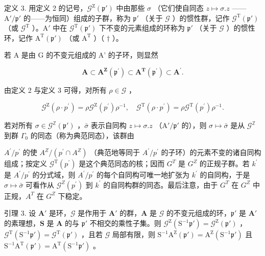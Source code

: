 定义 3. 用定义 2 的记号，\(\mathcal{G}^{\mathrm{Z}}(\mathfrak{p}')\) 中由那些 \(\sigma\) （它们使自同态 \(z \mapsto \sigma.z\) ——\(\mathrm{A}' / \mathfrak{p}'\) 的——为恒同）组成的子群，称为 \(\mathfrak{p}'\) （关于 \(\mathcal{G}\) ）的惯性群，记作 \(\mathcal{G}^{\mathrm{T}}(\mathfrak{p}')\) （或 \(\mathcal{G}^{\mathrm{T}}\) ）。\(\mathrm{A}'\) 中在 \(\mathcal{G}^{\mathrm{T}}(\mathfrak{p}')\) 下不变的元素组成的环称为 \(\mathfrak{p}'\) （关于 \(\mathcal{G}\) ）的惯性环，记作 \(\mathrm{A}^{\mathrm{T}}(\mathfrak{p}')\) （或 \(\mathrm{A}^{\mathrm{T}}\) ）（ \(\dagger\) ）。

若 A 是由 G 的不变元组成的 A' 的子环，则显然

\[
\mathbf {A} \subset \mathbf {A} ^ {\mathbf {Z}} (\mathfrak {p} ^ {\prime}) \subset \mathbf {A} ^ {\mathbf {T}} (\mathfrak {p} ^ {\prime}) \subset \mathbf {A} ^ {\prime}.\tag{1}
\]

由定义 2 与定义 3 可得，对所有 \(\rho \in \mathcal{G}\) ，

\[
\mathcal {G} ^ {\mathrm{Z}} (\rho \cdot p ^ {\prime}) = \rho \mathcal {G} ^ {\mathrm{Z}} (p ^ {\prime}) \rho^ {- 1}, \quad \mathcal {G} ^ {\mathrm{T}} (\rho \cdot p ^ {\prime}) = \rho \mathcal {G} ^ {\mathrm{T}} (p ^ {\prime}) \rho^ {- 1}.\tag{2}
\]

若对所有 \(\sigma \in \mathcal{G}^{\mathbb{Z}}(\mathfrak{p}')\) ，\(\bar{\sigma}\) 表示自同构 \(z \mapsto \sigma. z\) （\(\mathrm{A}' / \mathfrak{p}'\) 的），则 \(\sigma \mapsto \bar{\sigma}\) 是从 \(\mathcal{G}^{\mathbb{Z}}\) 到群 \(\Gamma_0\) 的同态（称为典范同态），该群由

\(A^{\prime}/p^{\prime}\) 的使 \(A^{Z}/(p^{\prime} \cap A^{Z})\) （典范地等同于 \(A^{\prime}/p^{\prime}\) 的子环）的元素不变的诸自同构组成；按定义 \(\mathcal{G}^{\mathrm{T}}(p^{\prime})\) 是这个典范同态的核；因而 \(G^{T}\) 是 \(G^{Z}\) 的正规子群。若 \(k^{\prime}\) 是 \(A^{\prime}/p^{\prime}\) 的分式域，则 \(A^{\prime}/p^{\prime}\) 的每个自同构可唯一地扩张为 \(k^{\prime}\) 的自同构，于是 \(\sigma \mapsto \bar{\sigma}\) 可看作从 \(\mathcal{G}^{Z}(p^{\prime})\) 到 \(k^{\prime}\) 的自同构群的同态。最后注意，由于 \(G^{T}\) 在 \(G^{Z}\) 中正规，\(A^{T}\) 在 \(G^{Z}\) 下稳定。

引理 3. 设 \(\mathbf{A}'\) 是环，\(\mathcal{G}\) 是作用于 \(\mathbf{A}'\) 的群，\(\mathbf{A}\) 是 \(\mathcal{G}\) 的不变元组成的环，\(\mathfrak{p}'\) 是 \(\mathbf{A}'\) 的素理想，\(\mathbf{S}\) 是 \(\mathbf{A}\) 的与 \(\mathfrak{p}'\) 不相交的乘性子集。则 \(\mathcal{G}^{\mathrm{Z}}(\mathrm{S}^{-1}\mathfrak{p}') = \mathcal{G}^{\mathrm{Z}}(\mathfrak{p}')\) ，\(\mathcal{G}^{\mathrm{T}}(\mathrm{S}^{-1}\mathfrak{p}') = \mathcal{G}^{\mathrm{T}}(\mathfrak{p}')\) ，且若 \(\mathcal{G}\) 局部有限，则 \(\mathrm{S}^{-1}\mathrm{A}^{\mathrm{Z}}(\mathfrak{p}') = \mathrm{A}^{\mathrm{Z}}(\mathrm{S}^{-1}\mathfrak{p}')\) 且 \(\mathrm{S}^{-1}\mathrm{A}^{\mathrm{T}}(\mathfrak{p}') = \mathrm{A}^{\mathrm{T}}(\mathrm{S}^{-1}\mathfrak{p}')\) 。

